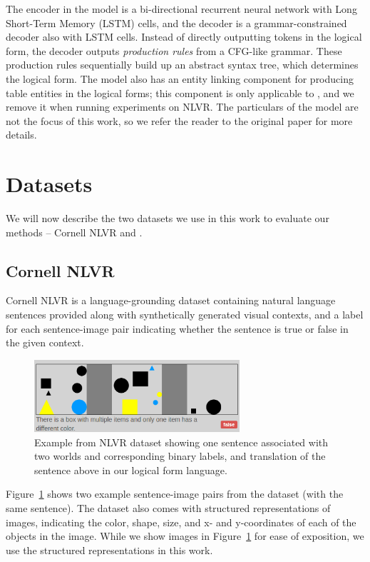 The encoder in the model is a bi-directional recurrent neural network with Long Short-Term Memory (LSTM) \citep{hochreiter1997long} cells, and the decoder is a grammar-constrained decoder also with LSTM cells.  Instead of directly outputting tokens in the logical form, the decoder outputs \emph{production rules} from a CFG-like grammar.  These production rules sequentially build up an abstract syntax tree, which determines the logical form.  The model also has an entity linking component for producing table entities in the logical forms; this component is only applicable to \WTQ{}, and we remove it when running experiments on NLVR.  The particulars of the model are not the focus of this work, so we refer the reader to the original paper for more details.

\section{Datasets} \label{sec:datasets}
We will now describe the two datasets we use in this work to evaluate our methods -- Cornell NLVR and \WTQ.
\subsection{Cornell NLVR}
Cornell NLVR is a language-grounding dataset containing natural language sentences provided along with synthetically generated visual contexts, and a label for each sentence-image pair indicating whether the sentence is true or false in the given context. 
\begin{figure}
	\centering
		\includegraphics[width=3in]{figures/nlvr_example.png}
		    \caption{Example from NLVR dataset showing one sentence associated with two worlds and corresponding binary labels, and translation of the sentence above in our logical form language.}
			\label{fig:nlvr_example}
\end{figure}
Figure~\ref{fig:nlvr_example} shows two example sentence-image pairs from the dataset (with the same sentence). The dataset also comes with structured representations of images, indicating the color, shape, size, and x- and y-coordinates of each of the objects in the image. While we show images in Figure~\ref{fig:nlvr_example} for ease of exposition, we use the structured representations in this work.

